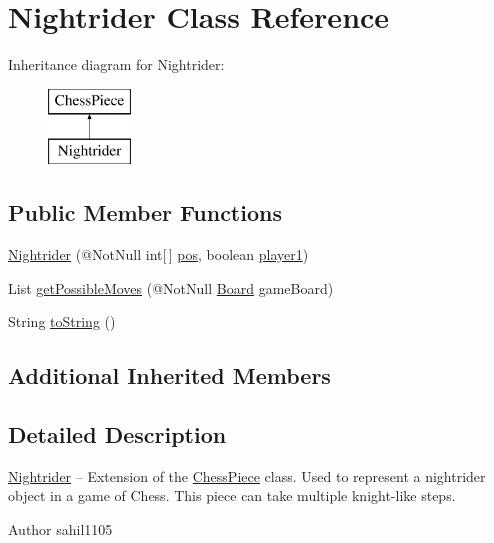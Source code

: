 \hypertarget{class_nightrider}{}\section{Nightrider Class Reference}
\label{class_nightrider}
Inheritance diagram for Nightrider\+:\begin{figure}[H]
\begin{center}
\leavevmode
\includegraphics[height=2.000000cm]{class_nightrider}
\end{center}
\end{figure}
\subsection*{Public Member Functions}
\begin{DoxyCompactItemize}
\item 
\mbox{\hyperlink{class_nightrider_a19b9e982221207c0108a3e2bbdd302a4}{Nightrider}} (@Not\+Null int\mbox{[}$\,$\mbox{]} \mbox{\hyperlink{class_chess_piece_ae9f0da2b5fca2557eab359044a7ba1ac}{pos}}, boolean \mbox{\hyperlink{class_chess_piece_aa8711ff5ce8a45159b9b30c8148a34b2}{player1}})
\item 
List \mbox{\hyperlink{class_nightrider_aa8b346c370506fa6e1c6ab80ed0d16d0}{get\+Possible\+Moves}} (@Not\+Null \mbox{\hyperlink{class_board}{Board}} game\+Board)
\item 
String \mbox{\hyperlink{class_nightrider_a0ff693c0576916c80f08f4d060b1867d}{to\+String}} ()
\end{DoxyCompactItemize}
\subsection*{Additional Inherited Members}


\subsection{Detailed Description}
\mbox{\hyperlink{class_nightrider}{Nightrider}} -- Extension of the \mbox{\hyperlink{class_chess_piece}{Chess\+Piece}} class. Used to represent a nightrider object in a game of Chess. This piece can take multiple knight-\/like steps. \begin{DoxyAuthor}{Author}
sahil1105 
\end{DoxyAuthor}


